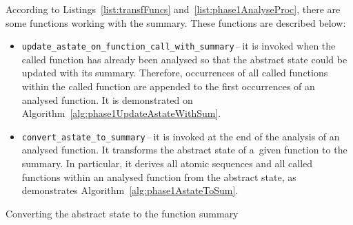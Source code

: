 According to Listings~\ref{list:transfFuncs}
and~\ref{list:phase1AnalyseProc}, there are some functions working
with the summary. These functions are described below:
\begin{itemize}
    \item
        \texttt{update\_astate\_on\_function\_call\_with\_summary}\,--\,it is
        invoked when the called \linebreak function has already been analysed
        so that the abstract state could be updated with its summary.
        Therefore, occurrences of all called functions within the called
        function are appended to the first occurrences of an analysed function.
        It is demonstrated on Algorithm~\ref{alg:phase1UpdateAstateWithSum}.

    \item
        \texttt{convert\_astate\_to\_summary}\,--\,it is invoked at the end
        of the analysis of an analysed function. It transforms the abstract
        state of a~given function to the summary. In particular, it
        derives all atomic sequences and all called functions within an
        analysed function from the abstract state, as demonstrates
        Algorithm~\ref{alg:phase1AstateToSum}.
\end{itemize}

\begin{algorithm}[hbt]


    \caption{%
        Updating the abstract state with the summary of a~called function
    }
    \label{alg:phase1UpdateAstateWithSum}
\end{algorithm}

\begin{algorithm}[hbt]


    \caption{Converting the abstract state to the function summary}
    \label{alg:phase1AstateToSum}
\end{algorithm}


